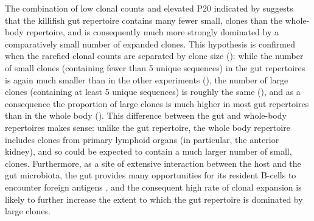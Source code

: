 The combination of low clonal counts and elevated P20 indicated by  suggests that the killifish gut repertoire contains many fewer small, \naive clones than the whole-body repertoire, and is consequently much more strongly dominated by a comparatively small number of expanded clones. This hypothesis is confirmed when the rarefied clonal counts are separated by clone size (): while the number of small clones (containing fewer than 5 unique sequences) in the gut repertoires is again much smaller than in the other experiments (), the number of large clones (containing at least 5 unique sequences) is roughly the same (), and as a consequence the proportion of large clones is much higher in most gut repertoires than in the whole body (). This difference between the gut and whole-body repertoires makes sense: unlike the gut repertoire, the whole body repertoire includes clones from primary lymphoid organs (in particular, the anterior kidney), and so could be expected to contain a much larger number of small, \naive clones. Furthermore, as a site of extensive interaction between the host and the gut microbiota, the gut provides many opportunities for its resident B-cells to encounter foreign antigens \parencite{caruso2009immunosenescence} , and the consequent high rate of clonal expansion is likely to further increase the extent to which the gut repertoire is dominated by large clones.

